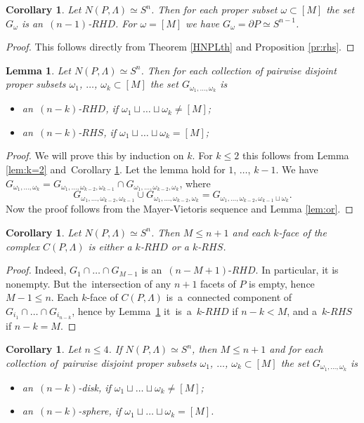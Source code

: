 \documentclass[12pt]{amsart}
\newtheorem{corollary}[formula]{Corollary}
\newtheorem{lemma}[formula]{Lemma}
\theoremstyle{definition}
\theoremstyle{remark}
\begin{document}
\begin{corollary}\label{cor:k=1}
Let $N(P,\Lambda)\simeq S^n$. Then for each proper subset $\omega\subset [M]$ the set 
$G_{\omega}$ is an~$(n-1)$-$RHD$. For $\omega=[M]$ we have $G_{\omega}=\partial P\simeq S^{n-1}$.
\end{corollary}
\begin{proof}
This follows directly from Theorem \ref{HNPLth} and Proposition \ref{pr:rhs}.
\end{proof}

\begin{lemma}\label{lem:RHDS}
Let $N(P,\Lambda)\simeq S^n$. Then for 
each collection of pairwise disjoint proper subsets $\omega_1$, $\dots$, $\omega_k\subset[M]$ 
the set $G_{\omega_1,\dots,\omega_k}$ is 
\begin{itemize}
\item an~$(n-k)$-$RHD$, if $\omega_1\sqcup\dots\sqcup\omega_k\ne[M]$;
\item an~$(n-k)$-$RHS$, if $\omega_1\sqcup\dots\sqcup\omega_k=[M]$;
\end{itemize} 
\end{lemma}
\begin{proof}
We will prove this by induction on $k$. For $k\leqslant 2$ this follows from Lemma \ref{lem:k=2} and~Corollary \ref{cor:k=1}.
Let the lemma hold for $1$, $\dots$, $k-1$. We have 
$G_{\omega_1,\dots,\omega_k}=
G_{\omega_1,\dots,\omega_{k-2},\omega_{k-1}}\cap G_{\omega_1,\dots,\omega_{k-2},\omega_k}$,
where $$
G_{\omega_1,\dots,\omega_{k-2},\omega_{k-1}}\cup G_{\omega_1,\dots,\omega_{k-2},\omega_k}=
G_{\omega_1,\dots,\omega_{k-2},\omega_{k-1}\sqcup \omega_k}.
$$ 
Now the proof follows from the Mayer-Vietoris sequence and Lemma \ref{lem:or}. 
\end{proof}
\begin{corollary}\label{cor:NPSn}
Let $N(P,\Lambda)\simeq S^n$. Then $M\leqslant n+1$ and each $k$-face of the complex $C(P,\Lambda)$
is either a $k$-$RHD$ or a $k$-$RHS$.
\end{corollary}
\begin{proof}
Indeed, $G_1\cap\dots\cap G_{M-1}$ is an~$(n-M+1)$-$RHD$. In particular,
it is nonempty. But 
the~intersection of any $n+1$ facets of $P$ is empty, hence $M-1\leqslant n$.  Each $k$-face of $C(P,\Lambda)$
is~a~connected component of $G_{i_1}\cap\dots\cap G_{i_{n-k}}$, hence by Lemma~\ref{lem:RHDS}
it~is~a~$k$-$RHD$ if $n-k<M$, and a~$k$-$RHS$ if $n-k=M$. 
\end{proof}
\begin{corollary}\label{cor:34nM}
Let $n\leqslant 4$. If $N(P,\Lambda)\simeq S^n$, then $M\leqslant n+1$
and for each collection of~pairwise disjoint proper subsets $\omega_1$, $\dots$, $\omega_k\subset[M]$ 
the set $G_{\omega_1,\dots,\omega_k}$ is 
\begin{itemize}
\item an~$(n-k)$-disk, if $\omega_1\sqcup\dots\sqcup\omega_k\ne[M]$;
\item an~$(n-k)$-sphere, if $\omega_1\sqcup\dots\sqcup\omega_k=[M]$.
\end{itemize}
\end{corollary}
\end{document}
